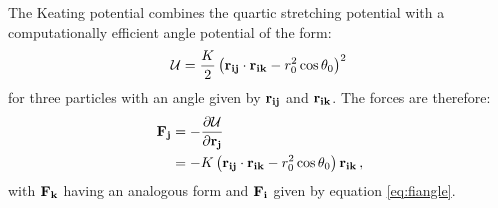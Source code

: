 The Keating potential combines the quartic stretching potential with a computationally efficient angle potential of the form:
\begin{equation}
	\mathcal{U} = \frac{K}{2}\left(\mathbf{r_{ij}}\cdot\mathbf{r_{ik}}-r_0^2\cos\theta_0\right)^2\,
\end{equation}
for three particles with an angle given by $\mathbf{r_{ij}}$ and $\mathbf{r_{ik}}$.
The forces are therefore:
\begin{align}
	\mathbf{F_j}&=-\frac{\partial \mathcal{U}}{\partial \mathbf{r_j}} \nonumber \\ 
	&=-K\left(\mathbf{r_{ij}}\cdot\mathbf{r_{ik}}-r_0^2\cos\theta_0\right)\mathbf{r_{ik}} \,,
\end{align}
with $\mathbf{F_k}$ having an analogous form and $\mathbf{F_i}$ given by equation \eqref{eq:fiangle}.

